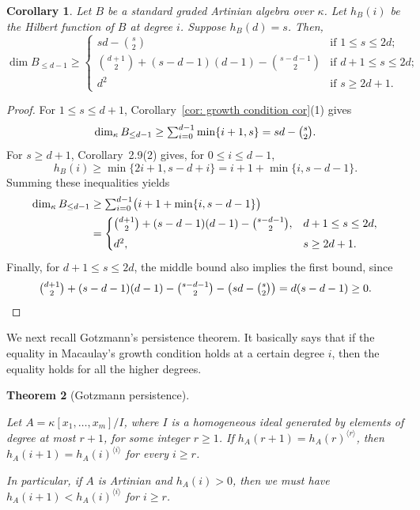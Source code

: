 \documentclass[11pt]{amsart}
\newtheorem{theorem}{Theorem}[section]
\newtheorem{corollary}[theorem]{Corollary}
\theoremstyle{definition}
\newcommand{\itr}{{\langle i \rangle}}
\newcommand{\ka}{\kappa}
\newcommand{\tsum}{\mathop{\textstyle\sum}\nolimits}
\begin{document}
\begin{corollary}\label{cor: macaulay lower bound}
Let $B$ be a standard graded Artinian algebra over $\ka$. Let $h_B(i)$ be the Hilbert function of $B$ at degree $i$. 
Suppose $h_B(d)=s$. Then,
\[
\dim B_{\le d-1} \geq
\begin{cases}
sd-\binom{s}{2} 
& \text{if } 1 \leq s\leq 2d;\\
\binom{d+1}{2}+(s-d-1)(d-1)-\binom{s-d-1}{2} 
&\text{if } d+1 \leq s\leq 2d;\\
d^2
&\text{if } s\geq 2d+1.
\end{cases}
\]
\end{corollary}


\begin{proof}
For $1\le s\le d+1$, Corollary~\ref{cor: growth condition cor}(1) gives
\[
\dim_\kappa B_{\le d-1}
\ge \tsum_{i=0}^{d-1}\min\{i+1,s\}
=sd-\tbinom{s}{2}.
\]
For $s\ge d+1$, Corollary~2.9(2) gives, for
$0\le i\le d-1$,
\[
h_B(i)\ge \min\{2i+1,s-d+i\}
=i+1+\min\{i,s-d-1\}.
\]
Summing these inequalities yields
\[
\begin{aligned}
\dim_\kappa B_{\le d-1}
&\ge \tsum_{i=0}^{d-1}
   \bigl(i+1+\min\{i,s-d-1\}\bigr)\\
&=
\begin{cases}
\displaystyle
\tbinom{d+1}{2}+(s-d-1)(d-1)-\tbinom{s-d-1}{2},
& d+1\le s\le 2d,\\[4pt]
d^2, & s\ge 2d+1.
\end{cases}
\end{aligned}
\]
Finally, for $d+1\le s\le 2d$, the middle bound also
implies the first bound, since
\[
\tbinom{d+1}{2}+(s-d-1)(d-1)-\tbinom{s-d-1}{2}
-\left(sd-\tbinom{s}{2}\right)
=d(s-d-1)\ge0.
\]
\end{proof}






We next recall Gotzmann's persistence theorem. It basically says that if the equality in Macaulay's growth condition holds at a certain degree $i$, then the equality holds for all the higher degrees. 
\begin{theorem}[Gotzmann persistence]
\label{thm:gotzmann}\cite[Theorem 2.8]{gunturkun2021survey}

\noindent Let $A=\kappa[x_1,\ldots,x_m]/I$, where $I$ is a homogeneous
ideal generated by elements of degree at most $r+1$, for some integer
$r\geq 1$. If $h_A(r+1)=h_A(r)^{\langle r\rangle}$, then $h_A(i+1)=h_A(i)^{\langle i\rangle}$ for every $i\geq r$.

In particular, if $A$ is Artinian and $h_A(i)>0$, then we must have $h_A(i+1)<h_A(i)^\itr$ for $i \geq r$.
\end{theorem}
\end{document}
